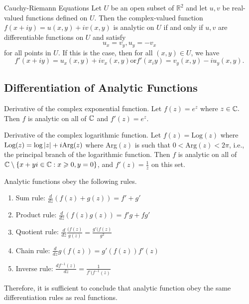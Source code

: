 \documentclass[11pt,reqno,oneside,a4paper]{article}
\begin{document}
\begin{thm}{Cauchy-Riemann Equations}
Let $U$ be an open subset of $\mathbb{R}^2$ and let $u,v$ be real-valued functions defined on $U.$ Then the complex-valued function $f(x+iy) = u(x,y) + iv(x,y)$ is analytic on $U$ if and only if $u,v$ are differentiable functions on $U$ and satisfy $$u_x=v_y, u_y = -v_x$$ for all points in $U$. If this is the case, then for all $(x,y)\in U$, we have $$f'(x+iy) = u_x(x,y)+iv_x(x,y) \text{or} f'(x_iy) = v_y(x,y) - iu_y(x,y).$$
\end{thm}




\subsection{Differentiation of Analytic Functions}

\begin{thm}{Derivative of the complex exponential function.}
Let $f(z) = e^z$ where $z\in\mathbb C.$ Then $f$ is analytic on all of $\mathbb C$ and $f'(z) = e^z.$
\end{thm}


\begin{thm}{Derivative of the complex logarithmic function.}
Let $f(z)=\text{Log}(z)$ where $\text{Log}(z)=\text{log}\left\lvert z\right\rvert+i\text{Arg}(z)$ where Arg$(z)$ is such that $0< \text{Arg}(z)<2\pi$, i.e., the principal branch of the logarithmic function.
Then $f$ is analytic on all of $\mathbb C \setminus \{x+yi \in \mathbb C : x \geqslant 0, y = 0\}$, and $f'(z)=\frac{1}{z}$ on this set.
\end{thm}


Analytic functions obey the following rules. 

\begin{enumerate}
	\item Sum rule: $\frac{d}{dz} (f(z) + g(z)) = f' + g'$
	\item Product rule: $\frac{d}{dz}(f(z)g(z)) = f'g + fg'$
	\item Quotient rule: $\frac{d}{dz} \frac{(f(z)}{g(z)} = \frac{g'(f(z)}{g^2}$
	\item Chain rule: $\frac{d}{dz} g(f(z)) = g'(f(z))f'(z)$
	\item Inverse rule: $\frac{df^{-1}(z)}{dz} = \frac{1}{f'(f^{-1}(z)}$
\end{enumerate}

Therefore, it is sufficient to conclude that analytic function obey the same differentiation rules as real functions.
\end{document}
